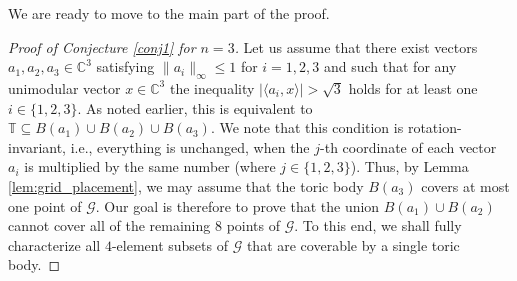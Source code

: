 \documentclass[12pt, a4paper]{article}
\theoremstyle{plain} %
\theoremstyle{definition} %
\theoremstyle{remark} %
\begin{document}
We are ready to move to the main part of the proof.

\begin{proof}[Proof of Conjecture \ref{conj1} for $n=3$]

Let us assume that there exist vectors $a_1, a_2, a_3 \in \mathbb{C}^3$ satisfying $\|a_i\|_{\infty} \leq 1$ for $i=1, 2, 3$ and such that for any unimodular vector $x \in \mathbb{C}^3$ the inequality $| \langle a_i, x \rangle | > \sqrt{3}$ holds for at least one $i \in \{1, 2, 3\}$. As noted earlier, this is equivalent to $\mathbb{T} \subseteq B(a_1) \cup B(a_2) \cup B(a_3)$. We note that this condition is rotation-invariant, i.e., everything is unchanged, when the $j$-th coordinate of each vector $a_i$ is multiplied by the same number (where $j \in \{1, 2, 3\}$). Thus, by Lemma \ref{lem:grid_placement}, we may assume that the toric body $B(a_3)$ covers at most one point of $\mathcal{G}$. Our goal is therefore to prove that the union $B(a_1) \cup B(a_2)$ cannot cover all of the remaining $8$ points of $\mathcal{G}$. To this end, we shall fully characterize all $4$-element subsets of $\mathcal{G}$ that are coverable by a single toric body.


\end{proof}
\end{document}
